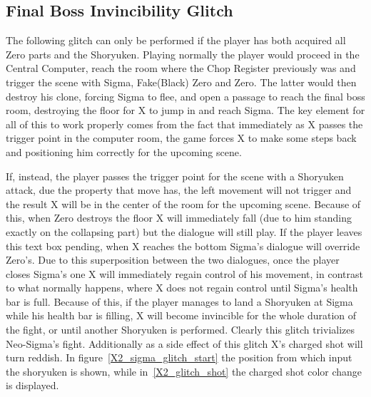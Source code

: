 \subsection{Final Boss Invincibility Glitch}\label{Final_battle_glitch}
The following glitch can only be performed if the player has both acquired all Zero parts and the Shoryuken. Playing normally the player would proceed in the Central Computer, reach the room where the Chop Register previously was and trigger the scene with Sigma, Fake(Black) Zero and Zero. The latter would then destroy his clone, forcing Sigma to flee, and open a passage to reach the final boss room, destroying the floor for X to jump in and reach Sigma. The key element for all of this to work properly comes from the fact that immediately as X passes the trigger point in the computer room, the game forces X to make some steps back and positioning him correctly for the upcoming scene. 

If, instead, the player passes the trigger point for the scene with a Shoryuken attack, due the property that move has, the left movement will not trigger and the result X will be in the center of the room for the upcoming scene. Because of this, when Zero destroys the floor X will immediately fall (due to him standing exactly on the collapsing part) but the dialogue will still play. If the player leaves this text box pending, when X reaches the bottom Sigma's dialogue will override Zero's. Due to this superposition between the two dialogues, once the player closes Sigma's one X will immediately regain control of his movement, in contrast to what normally happens, where X does not regain control until Sigma's health bar is full. Because of this, if the player manages to land a Shoryuken at Sigma while his health bar is filling, X will become invincible for the whole duration of the fight, or until another Shoryuken is performed. Clearly this glitch trivializes Neo-Sigma's fight. Additionally as a side effect of this glitch X's charged shot will turn reddish.
In figure~\ref{X2_sigma_glitch_start} the position from which input the shoryuken is shown, while in~\ref{X2_glitch_shot} the charged shot color change is displayed.

